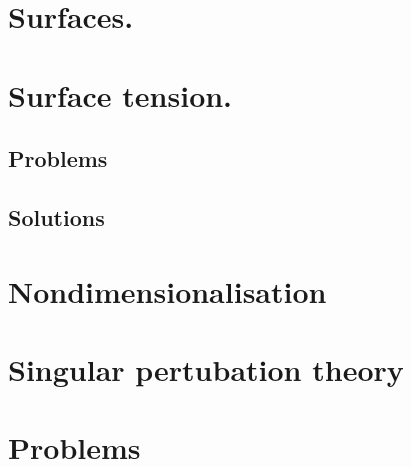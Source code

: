 
   \chapter{Surfaces.}

   \chapter{Surface tension.}
      \section{Problems}
         
      \section{Solutions}
         \shipoutAnswer

   \chapter{Nondimensionalisation}
      
      

   
   
   
   

   \chapter{Singular pertubation theory}
      
      

   
   
   

   \chapter{Problems}
